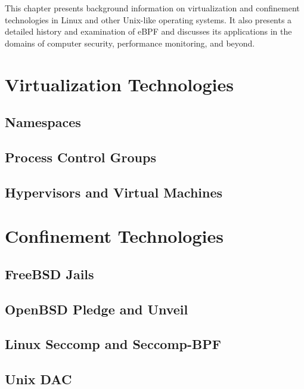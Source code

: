 This chapter presents background information on virtualization and confinement
technologies in Linux and other Unix-like operating systems. It also presents a detailed
history and examination of eBPF and discusses its applications in the domains of computer
security, performance monitoring, and beyond.

\section{Virtualization Technologies}%
\label{s:virtualization-bg}

\subsection{Namespaces}%
\label{ss:namespaces-bg}

\subsection{Process Control Groups}%
\label{ss:cgroups-bg}

\subsection{Hypervisors and Virtual Machines}%
\label{ss:vms-bg}




\section{Confinement Technologies}%
\label{s:confinement-bg}

\subsection{FreeBSD Jails}%
\label{ss:jails-bg}

\subsection{OpenBSD Pledge and Unveil}%
\label{ss:pledge-bg}

\subsection{Linux Seccomp and Seccomp-BPF}%
\label{ss:seccomp-bg}

\subsection{Unix DAC}%
\label{ss:unix-dac-bg}

